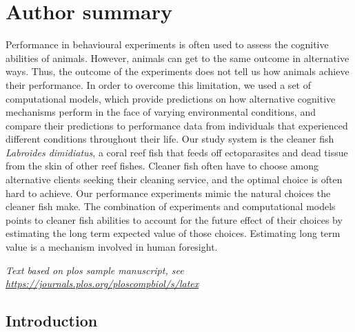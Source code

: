 \documentclass[10pt,letterpaper]{article}
\begin{document}
\section*{Author summary}
Performance in behavioural experiments is often used to assess the
cognitive abilities of animals. However, animals can get to the same
outcome in alternative ways. Thus, the outcome of the experiments does
not tell us how animals achieve their performance. In order to overcome
this limitation, we used a set of computational models, which provide
predictions on how alternative cognitive mechanisms perform in the face
of varying environmental conditions, and compare their predictions to
performance data from individuals that experienced different conditions
throughout their life. Our study system is the cleaner fish
\emph{Labroides dimidiatus}, a coral reef fish that feeds off
ectoparasites and dead tissue from the skin of other reef fishes.
Cleaner fish often have to choose among alternative clients seeking
their cleaning service, and the optimal choice is often hard to achieve.
Our performance experiments mimic the natural choices the cleaner fish
make. The combination of experiments and computational models points to
cleaner fish abilities to account for the future effect of their choices
by estimating the long term expected value of those choices. Estimating
long term value is a mechanism involved in human foresight.

\linenumbers

\emph{Text based on plos sample manuscript, see
\url{https://journals.plos.org/ploscompbiol/s/latex}}

\hypertarget{introduction}{%
\subsection{Introduction}\label{introduction}}
\end{document}
